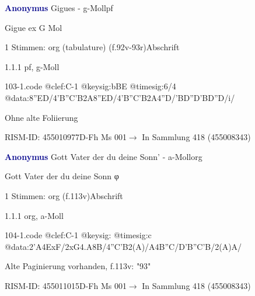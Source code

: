 \documentclass[twocolumn, 12pt]{book}
\begin{document}
\par \vspace{16pt} \textcolor{darkblue}{\textbf{Anonymus  }}\hfillplus{\textbf{[103]}}\newline Gigues - g-Moll\newline pf
\par \begin{itshape} Gigue ex G Mol\end{itshape} 
\par \textcolor{darkblue}{}  1 Stimmen: org (tabulature)  (f.92v-93r)\newline Abschrift
\par 1.1.1  pf, g-Moll  
\begin{filecontents*}{103-1.code}
@clef:C-1
@keysig:bBE
@timesig:6/4
@data:{8''ED}/4'B''C'B2A{8''ED}/4'B''C'B2A4''D/'BD''D'BD''D/i/
\end{filecontents*}
\newline %
\par Ohne alte Foliierung
\par RISM-ID: 455010977\newline D-Fh  Ms 001\newline $\rightarrow$ In Sammlung 418 (455008343)
      
\par \vspace{16pt} \textcolor{darkblue}{\textbf{Anonymus  }}\hfillplus{\textbf{[104]}}\newline Gott Vater der du deine Sonn' - a-Moll\newline org
\par \begin{itshape}[f.113v, heading:] Gott Vater der du deine Sonn φ\end{itshape} 
\par \textcolor{darkblue}{}  1 Stimmen: org  (f.113v)\newline Abschrift
\par 1.1.1  org, a-Moll  
\begin{filecontents*}{104-1.code}
@clef:C-1
@keysig:
@timesig:c
@data:2'A4ExF/2xG4.A8B/4''C'B2(A)/A4B''C/D'B''C'B/2(A)A/
\end{filecontents*}
\newline %
\par Alte Paginierung vorhanden, f.113v: "93"
\par RISM-ID: 455011015\newline D-Fh  Ms 001\newline $\rightarrow$ In Sammlung 418 (455008343)
      
\end{document}
